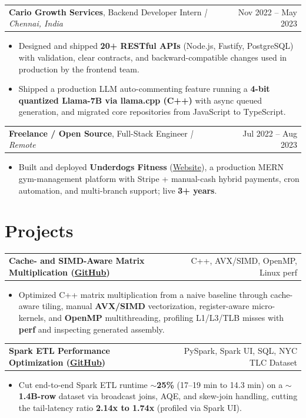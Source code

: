\documentclass[letterpaper,11pt]{article}
\makeatletter
\newcommand{\expItem}[4]{%
  \vspace{3pt}
  \begin{tabular*}{\textwidth}{@{}l@{\extracolsep{\fill}}r@{}}
    \textbf{#1}, #2 \textit{| #3} & #4 \\
  \end{tabular*}\par\vspace{-2pt}
}
\newcommand{\projItem}[2]{%
  \vspace{6pt}
  \begin{tabular*}{\textwidth}{@{}l@{\extracolsep{\fill}}r@{}}
    \textbf{#1} & #2 \\
  \end{tabular*}\par\vspace{-2pt}
}
\makeatother
\begin{document}
\expItem{Cario Growth Services}{Backend Developer Intern}{Chennai, India}{Nov 2022 -- May 2023}
\begin{itemize}
  \item Designed and shipped \textbf{20+ RESTful APIs} (Node.js, Fastify, PostgreSQL) with validation, clear contracts, and backward-compatible changes used in production by the frontend team.
  \item Shipped a production LLM auto-commenting feature running a \textbf{4-bit quantized Llama-7B via llama.cpp (C++)} with async queued generation, and migrated core repositories from JavaScript to TypeScript.
\end{itemize}

\expItem{Freelance / Open Source}{Full-Stack Engineer}{Remote}{Jul 2022 -- Aug 2023}
\begin{itemize}
  \item Built and deployed \textbf{Underdogs Fitness} (\href{https://www.underdogsfitness.in/}{Website}), a production MERN gym-management platform with Stripe + manual-cash hybrid payments, cron automation, and multi-branch support; live \textbf{3+ years}.
\end{itemize}

\section{Projects}

\projItem{Cache- and SIMD-Aware Matrix Multiplication {\normalfont\small(\href{https://github.com/Deva-1903/cs690pf}{GitHub})}}{C++, AVX/SIMD, OpenMP, Linux perf}
\begin{itemize}
  \item Optimized C++ matrix multiplication from a naive baseline through cache-aware tiling, manual \textbf{AVX/SIMD} vectorization, register-aware micro-kernels, and \textbf{OpenMP} multithreading, profiling L1/L3/TLB misses with \textbf{perf} and inspecting generated assembly.
\end{itemize}

\projItem{Spark ETL Performance Optimization {\normalfont\small(\href{https://github.com/Deva-1903/Spark-ETL-Optimization}{GitHub})}}{PySpark, Spark UI, SQL, NYC TLC Dataset}
\begin{itemize}
  \item Cut end-to-end Spark ETL runtime \textbf{$\sim$25\%} (17--19 min to 14.3 min) on a \textbf{$\sim$1.4B-row} dataset via broadcast joins, AQE, and skew-join handling, cutting the tail-latency ratio \textbf{2.14x to 1.74x} (profiled via Spark UI).
\end{itemize}
\end{document}
